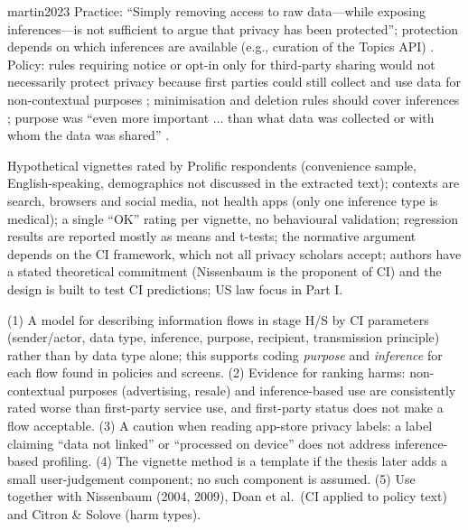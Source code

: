 \begin{papercard}{martin2023}
 Practice: ``Simply removing access to raw data—while exposing inferences—is not sufficient to argue that privacy has been protected''; protection depends on which inferences are available (e.g., curation of the Topics API) . Policy: rules requiring notice or opt-in only for third-party sharing would not necessarily protect privacy because first parties could still collect and use data for non-contextual purposes ; minimisation and deletion rules should cover inferences ; purpose was ``even more important ... than what data was collected or with whom the data was shared'' .

 Hypothetical vignettes rated by Prolific respondents (convenience sample, English-speaking, demographics not discussed in the extracted text); contexts are search, browsers and social media, not health apps (only one inference type is medical); a single ``OK'' rating per vignette, no behavioural validation; regression results are reported mostly as means and t-tests; the normative argument depends on the CI framework, which not all privacy scholars accept; authors have a stated theoretical commitment (Nissenbaum is the proponent of CI) and the design is built to test CI predictions; US law focus in Part I.

 (1) A model for describing information flows in stage H/S by CI parameters (sender/actor, data type, inference, purpose, recipient, transmission principle) rather than by data type alone; this supports coding \emph{purpose} and \emph{inference} for each flow found in policies and screens. (2) Evidence for ranking harms: non-contextual purposes (advertising, resale) and inference-based use are consistently rated worse than first-party service use, and first-party status does not make a flow acceptable. (3) A caution when reading app-store privacy labels: a label claiming ``data not linked'' or ``processed on device'' does not address inference-based profiling. (4) The vignette method is a template if the thesis later adds a small user-judgement component; no such component is assumed. (5) Use together with Nissenbaum (2004, 2009), Doan et al.\ (CI applied to policy text) and Citron \& Solove (harm types).
\end{papercard}
